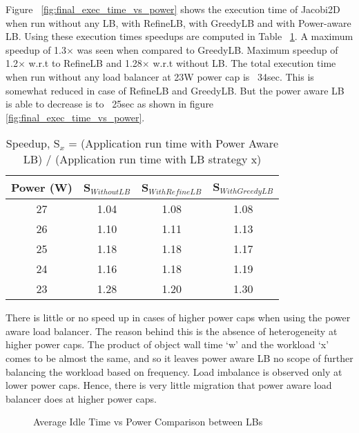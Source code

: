 Figure ~\ref{fig:final_exec_time_vs_power} shows the execution time of Jacobi2D when 
run without any LB, with RefineLB, with GreedyLB and with Power-aware LB. Using these execution times
speedups are computed in Table ~\ref{tb:1}. 
A maximum speedup of 1.3$\times$ was seen when compared
to GreedyLB. Maximum speedup of 1.2$\times$ w.r.t to RefineLB and 1.28$\times$ w.r.t without LB.
The total execution time when run without any load balancer at 23W power cap is
~34sec.  This is somewhat reduced in case of RefineLB and GreedyLB. But the
power aware LB is able to decrease is to ~25sec as shown in figure \ref{fig:final_exec_time_vs_power}. 

\begin{table}[h]
\begin{tabular}{|c|c|c|c|}
\hline
Power (W) & S$_{Without LB}$ & S$_{With Refine LB}$ & S$_{With Greedy LB}$ \\ \hline
27 & 1.04 & 1.08 & 1.08 \\ \hline
26 & 1.10 & 1.11 & 1.13 \\ \hline
25 & 1.18 & 1.18 & 1.17 \\ \hline
24 & 1.16 & 1.18 & 1.19 \\ \hline
23 & 1.28 & 1.20 & 1.30 \\ \hline
\end{tabular}
\caption{Speedup, S$_x$ = (Application run time with Power Aware LB) / (Application run time with LB strategy x) }
\label{tb:1}
\end{table}

There is little or no speed up in cases of higher power caps when using the
power aware load balancer. The reason behind this is the absence of
heterogeneity at higher power caps. The product of object wall time ‘w’ and the
workload ‘x’ comes to be almost the same, and so it leaves power aware LB no
scope of further balancing the workload based on frequency. Load imbalance is
observed only at lower power caps. Hence, there is very little migration that
power aware load balancer does at higher power caps. 

\begin{figure}
\centering
\caption{Average Idle Time vs Power Comparison between LBs}
\label{fig:avg_times_final_vs_power}
\end{figure}

